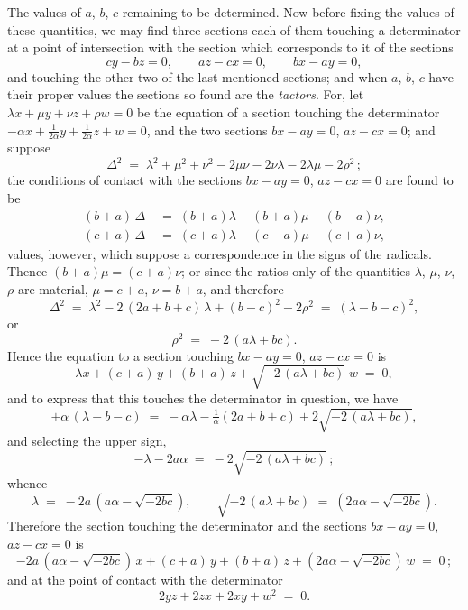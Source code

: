 \documentclass[11pt]{article}
\begin{document}
The values of $a$, $b$, $c$ remaining to be determined. Now before fixing the values of these quantities, we may find three sections each of them touching a determinator at a point of intersection with the section which corresponds to it of the sections
\[
cy - bz = 0,\qquad az - cx = 0,\qquad bx - ay = 0,
\]
and touching the other two of the last-mentioned sections; and when $a$, $b$, $c$ have their proper values the sections so found are the \emph{tactors}. For, let $\lambda x + \mu y + \nu z + \rho w = 0$ be the equation of a section touching the determinator $-\alpha x + \tfrac{1}{2\alpha}y + \tfrac{1}{2\alpha}z + w = 0$, and the two sections $bx - ay = 0$, $az - cx = 0$; and suppose
\[
\Delta^{2} \;=\; \lambda^{2} + \mu^{2} + \nu^{2} - 2\mu\nu - 2\nu\lambda - 2\lambda\mu - 2\rho^{2}\,;
\]
the conditions of contact with the sections $bx - ay = 0$, $az - cx = 0$ are found to be
\begin{align*}
(b + a)\,\Delta &\;=\; (b + a)\lambda - (b + a)\mu - (b - a)\nu,\\
(c + a)\,\Delta &\;=\; (c + a)\lambda - (c - a)\mu - (c + a)\nu,
\end{align*}
values, however, which suppose a correspondence in the signs of the radicals. Thence $(b + a)\mu = (c + a)\nu$; or since the ratios only of the quantities $\lambda$, $\mu$, $\nu$, $\rho$ are material, $\mu = c + a$, $\nu = b + a$, and therefore
\[
\Delta^{2} \;=\; \lambda^{2} - 2\,(2a + b + c)\,\lambda + (b - c)^{2} - 2\rho^{2} \;=\; (\lambda - b - c)^{2},
\]
or
\[
\rho^{2} \;=\; -2\,(a\lambda + bc).
\]
Hence the equation to a section touching $bx - ay = 0$, $az - cx = 0$ is
\[
\lambda x + (c + a)\,y + (b + a)\,z + \sqrt{-2\,(a\lambda + bc)}\;w \;=\; 0,
\]
and to express that this touches the determinator in question, we have
\[
\pm\alpha\,(\lambda - b - c) \;=\; -\alpha\lambda - \tfrac{1}{\alpha}(2a + b + c) + 2\sqrt{-2\,(a\lambda + bc)},
\]
and selecting the upper sign,
\[
-\lambda - 2a\alpha \;=\; -2\sqrt{-2\,(a\lambda + bc)}\,;
\]
whence
\[
\lambda \;=\; -2a\,(a\alpha - \sqrt{-2bc}),\qquad \sqrt{-2\,(a\lambda + bc)} \;=\; (2a\alpha - \sqrt{-2bc}).
\]
Therefore the section touching the determinator and the sections $bx - ay = 0$, $az - cx = 0$ is
\[
-2a\,(a\alpha - \sqrt{-2bc})\,x + (c + a)\,y + (b + a)\,z + (2a\alpha - \sqrt{-2bc})\,w \;=\; 0\,;
\]
and at the point of contact with the determinator
\[
2yz + 2zx + 2xy + w^{2} \;=\; 0.
\]

\bigskip
\end{document}
